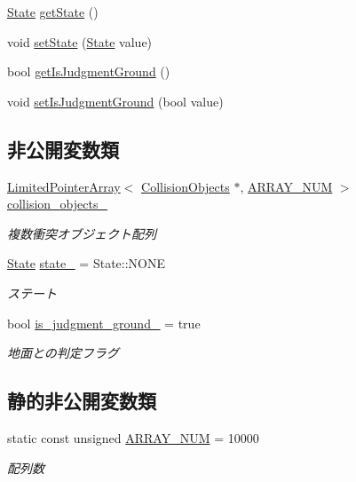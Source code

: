 \begin{DoxyCompactItemize}
\item 
\mbox{\hyperlink{class_collision_base_a4dd1ed00099a19c0176913af93c4e365}{State}} \mbox{\hyperlink{class_collision_base_af4e773951a4e1965e64410841a0292a4}{get\+State}} ()
\item 
void \mbox{\hyperlink{class_collision_base_a01db1e666b8e71c33969e9ab6bbc724e}{set\+State}} (\mbox{\hyperlink{class_collision_base_a4dd1ed00099a19c0176913af93c4e365}{State}} value)
\item 
bool \mbox{\hyperlink{class_collision_base_a7b9cd927976308f8719f3becc03b99a1}{get\+Is\+Judgment\+Ground}} ()
\item 
void \mbox{\hyperlink{class_collision_base_a231cb5c715701444db63db030c06b694}{set\+Is\+Judgment\+Ground}} (bool value)
\end{DoxyCompactItemize}
\subsection*{非公開変数類}
\begin{DoxyCompactItemize}
\item 
\mbox{\hyperlink{class_limited_pointer_array}{Limited\+Pointer\+Array}}$<$ \mbox{\hyperlink{class_collision_objects}{Collision\+Objects}} $\ast$, \mbox{\hyperlink{class_collision_base_a0ddcdd5ed993b19c6edabd9c50e76ba4}{A\+R\+R\+A\+Y\+\_\+\+N\+UM}} $>$ \mbox{\hyperlink{class_collision_base_a9ef8dfac9a07e31cb1d058b6a22e9640}{collision\+\_\+objects\+\_\+}}
\begin{DoxyCompactList}\small\item\em 複数衝突オブジェクト配列 \end{DoxyCompactList}\item 
\mbox{\hyperlink{class_collision_base_a4dd1ed00099a19c0176913af93c4e365}{State}} \mbox{\hyperlink{class_collision_base_a00000e1adbe3869939c8119a4ae830d0}{state\+\_\+}} = State\+::\+N\+O\+NE
\begin{DoxyCompactList}\small\item\em ステート \end{DoxyCompactList}\item 
bool \mbox{\hyperlink{class_collision_base_acc56eed7a6366d77bb2b80810f0a4ea7}{is\+\_\+judgment\+\_\+ground\+\_\+}} = true
\begin{DoxyCompactList}\small\item\em 地面との判定フラグ \end{DoxyCompactList}\end{DoxyCompactItemize}
\subsection*{静的非公開変数類}
\begin{DoxyCompactItemize}
\item 
static const unsigned \mbox{\hyperlink{class_collision_base_a0ddcdd5ed993b19c6edabd9c50e76ba4}{A\+R\+R\+A\+Y\+\_\+\+N\+UM}} = 10000
\begin{DoxyCompactList}\small\item\em 配列数 \end{DoxyCompactList}\end{DoxyCompactItemize}


